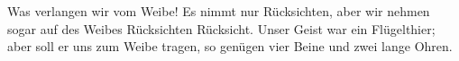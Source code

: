 Was verlangen wir vom Weibe! Es nimmt nur Rücksichten, aber wir nehmen sogar auf des Weibes Rücksichten Rücksicht. Unser Geist war ein Flügelthier; aber soll er uns zum Weibe tragen, so genügen vier Beine und zwei lange Ohren.
\par

